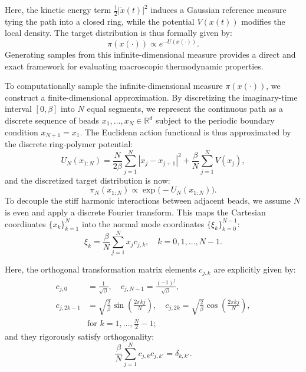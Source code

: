 \documentclass[%
 reprint,
 amsmath,amssymb,
 aps,
 pre,
]{revtex4-2}
\begin{document}
Here, the kinetic energy term $\frac{1}{2} |\dot{x}(t)|^2$ induces a Gaussian reference measure tying the path into a closed ring, while the potential $V(x(t))$ modifies the local density. The target distribution is thus formally given by:
\begin{equation*}
    \pi(x(\cdot)) \propto e^{-U(x(\cdot))}.
\end{equation*}
Generating samples from this infinite-dimensional measure provides a direct and exact framework for evaluating macroscopic thermodynamic properties.

To computationally sample the infinite-dimensional measure $\pi(x(\cdot))$, we construct a finite-dimensional approximation. By discretizing the imaginary-time interval $[0, \beta]$ into $N$ equal segments, we represent the continuous path as a discrete sequence of beads $x_1, \dots, x_N \in \mathbb{R}^d$ subject to the periodic boundary condition $x_{N+1} = x_1$. The Euclidean action functional is thus approximated by the discrete ring-polymer potential:
\begin{equation}
    U_N(x_{1:N}) = \frac{N}{2\beta} \sum_{j=1}^N |x_j - x_{j+1}|^2 + \frac{\beta}{N} \sum_{j=1}^N V(x_j),
    \label{eq: UNx}
\end{equation}
and the discretized target distribution is now:
\begin{equation*}
	\pi_N(x_{1:N})\propto \exp\big(-U_N(x_{1:N})\big).
\end{equation*}
To decouple the stiff harmonic interactions between adjacent beads, we assume $N$ is even and apply a discrete Fourier transform. This maps the Cartesian coordinates $\{x_k\}_{k=1}^N$ into the normal mode coordinates $\{\xi_k\}_{k=0}^{N-1}$:
\begin{equation}
    \xi_k = \frac{\beta}{N} \sum_{j=1}^N x_j c_{j,k}, \quad k = 0, 1, \dots, N-1.
\end{equation}

Here, the orthogonal transformation matrix elements $c_{j,k}$ are explicitly given by:
\begin{align*}
    c_{j,0} &= \frac{1}{\sqrt{\beta}}, \quad c_{j,N-1} = \frac{(-1)^j}{\sqrt{\beta}}, \\
    c_{j,2k-1} &= \sqrt{\frac{2}{\beta}} \sin\left(\frac{2\pi k j}{N}\right), \quad
    c_{j,2k} = \sqrt{\frac{2}{\beta}} \cos\left(\frac{2\pi k j}{N}\right), \\
    & \text{for } k = 1, \dots, \frac{N}{2} - 1;
\end{align*}
and they rigorously satisfy orthogonality:
\begin{equation*}
    \frac{\beta}{N} \sum_{j=1}^N c_{j,k} c_{j,k'} = \delta_{k,k'}.
\end{equation*}
\end{document}
